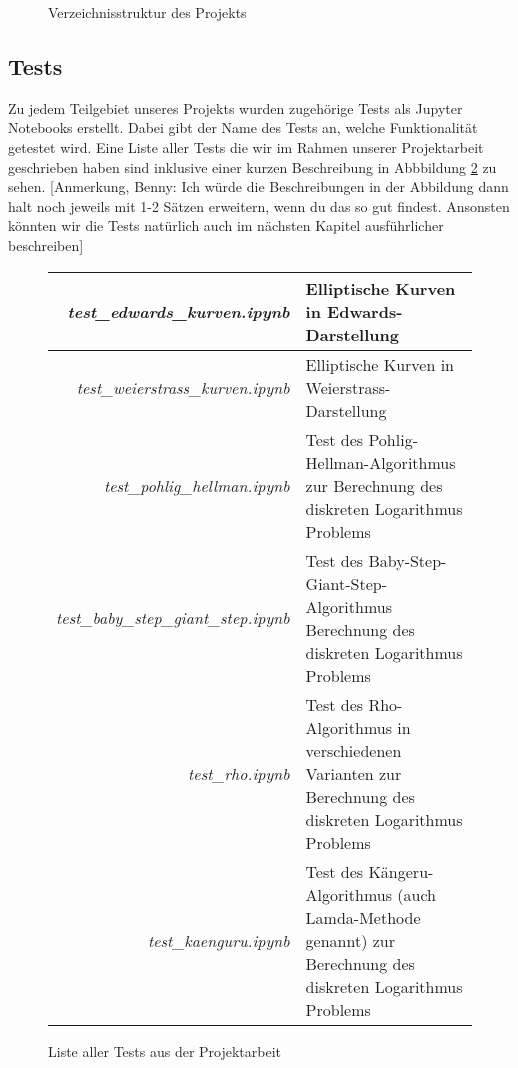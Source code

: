 \documentclass{scrartcl}
\begin{document}
\begin{figure}[h]
  \caption{Verzeichnisstruktur des Projekts}
  \label{fig:verzeichnisstruktur}
\end{figure}

\subsection{Tests}
\label{sec:tests}

Zu jedem Teilgebiet unseres Projekts wurden zugehörige Tests als Jupyter Notebooks erstellt. Dabei gibt der Name des Tests an, welche Funktionalität getestet wird. Eine Liste aller Tests die wir im Rahmen unserer Projektarbeit geschrieben haben sind inklusive einer kurzen Beschreibung in Abbbildung \ref{fig:tests} zu sehen. [Anmerkung, Benny: Ich würde die Beschreibungen in der Abbildung dann halt noch jeweils mit 1-2 Sätzen erweitern, wenn du das so gut findest. Ansonsten könnten wir die Tests natürlich auch im nächsten Kapitel ausführlicher beschreiben]

\begin{figure}[h]
 \centering
 \renewcommand{\arraystretch}{1.5}
 \begin{tabular}{r|p{8cm}}
  \emph{test\_edwards\_kurven.ipynb} & Elliptische Kurven in Edwards-Darstellung  \\
  \hline \emph{test\_weierstrass\_kurven.ipynb} & Elliptische Kurven in Weierstrass-Darstellung \\
  \hline \emph{test\_pohlig\_hellman.ipynb} & Test des Pohlig-Hellman-Algorithmus zur Berechnung des diskreten Logarithmus Problems \\
  \hline \emph{test\_baby\_step\_giant\_step.ipynb} & Test des Baby-Step-Giant-Step-Algorithmus Berechnung des diskreten Logarithmus Problems \\
  \hline \emph{test\_rho.ipynb} & Test des Rho-Algorithmus in verschiedenen Varianten zur Berechnung des diskreten Logarithmus Problems \\
  \hline \emph{test\_kaenguru.ipynb} & Test des Kängeru-Algorithmus (auch Lamda-Methode genannt) zur Berechnung des diskreten Logarithmus Problems \\
 \end{tabular}
 \renewcommand{\arraystretch}{1}
 \caption{Liste aller Tests aus der Projektarbeit}
 \label{fig:tests}
\end{figure}
\end{document}

